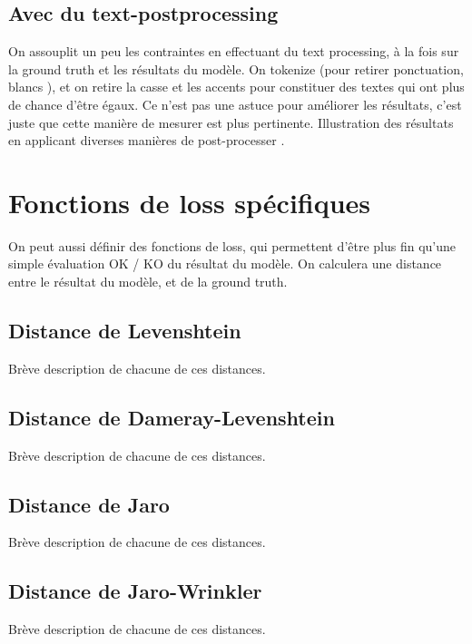             \subsection{Avec du \og text-postprocessing \fg}
        
            On assouplit un peu les contraintes en effectuant du text processing, à la fois sur la ground truth et les résultats du modèle.
            On tokenize (pour retirer ponctuation, \og blancs \fg), et on retire la casse et les accents pour constituer des textes qui ont plus de chance d'être égaux.
            Ce n'est pas une astuce pour améliorer les résultats, c'est juste que cette manière de mesurer est plus pertinente.
            Illustration des résultats en applicant diverses manières de \og post-processer \fg.

        \section{Fonctions de \og loss \fg spécifiques}

        On peut aussi définir des fonctions de loss, qui permettent d'être plus fin qu'une simple évaluation OK / KO du résultat du modèle.
        On calculera une distance entre le résultat du modèle, et de la ground truth.

            \subsection{Distance de Levenshtein}

            Brève description de chacune de ces distances.

            \subsection{Distance de Dameray-Levenshtein}

            Brève description de chacune de ces distances.
            
            \subsection{Distance de Jaro}
            Brève description de chacune de ces distances.

            \subsection{Distance de Jaro-Wrinkler}
            Brève description de chacune de ces distances.

